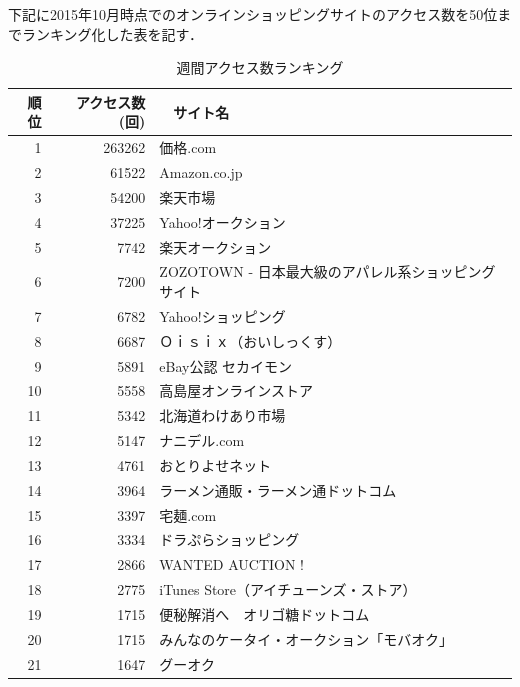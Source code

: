 下記に2015年10月時点でのオンラインショッピングサイトのアクセス数を50位までランキング化した表を記す．

\clearpage


\begin{table}[htb]

\label{週間アクセス数ランキング}
    \caption{週間アクセス数ランキング}
\newlength{\myranking}
\setlength{\myranking}{0.7cm}
  \begin{center}

\begin{tabular}{|r|r|p{30em}|}
\hline



	順位 & アクセス数(回) &　サイト名  \\ \hline \hline
	\parbox[c][\myranking][c]{0cm}{}
	1 & 263262 & 価格.com \\
	\parbox[c][\myranking][c]{0cm}{}
	2 & 61522 & Amazon.co.jp  \\
	\parbox[c][\myranking][c]{0cm}{}
	3 & 54200 & 楽天市場  \\
	\parbox[c][\myranking][c]{0cm}{}
	4 & 37225 & Yahoo!オークション  \\
	\parbox[c][\myranking][c]{0cm}{}
	5 & 7742 & 楽天オークション  \\
	\hline
	\parbox[c][\myranking][c]{0cm}{}
	6 & 7200 & ZOZOTOWN - 日本最大級のアパレル系ショッピングサイト  \\
	\parbox[c][\myranking][c]{0cm}{}
	7 & 6782 & Yahoo!ショッピング  \\
	\parbox[c][\myranking][c]{0cm}{}
	8 & 6687 & Ｏｉｓｉｘ（おいしっくす）  \\
	\parbox[c][\myranking][c]{0cm}{}
	9 & 5891 & eBay公認 セカイモン  \\
	\parbox[c][\myranking][c]{0cm}{}
	10 & 5558 & 高島屋オンラインストア  \\
	\hline
	\parbox[c][\myranking][c]{0cm}{}
	11 & 5342 & 北海道わけあり市場  \\
	\parbox[c][\myranking][c]{0cm}{}
	12 & 5147 & ナニデル.com  \\
	\parbox[c][\myranking][c]{0cm}{}
	13 & 4761 & おとりよせネット   \\
	\parbox[c][\myranking][c]{0cm}{}
	14 & 3964 & ラーメン通販・ラーメン通ドットコム  \\
	\parbox[c][\myranking][c]{0cm}{}
	15 & 3397 & 宅麺.com  \\
	\hline
	\parbox[c][\myranking][c]{0cm}{}
	16 & 3334 & ドラぷらショッピング \\
	\parbox[c][\myranking][c]{0cm}{}
	17 & 2866 & WANTED AUCTION !   \\
	\parbox[c][\myranking][c]{0cm}{}
	18 & 2775 & iTunes Store（アイチューンズ・ストア）  \\  
	\parbox[c][\myranking][c]{0cm}{}
	19 & 1715 &便秘解消へ　オリゴ糖ドットコム \\
	\parbox[c][\myranking][c]{0cm}{}
	20 & 1715 & みんなのケータイ・オークション「モバオク」 \\
	\hline
	\parbox[c][\myranking][c]{0cm}{}
	21 & 1647 &グーオク  \\


\end{tabular}
\end{center}
\end{table}
